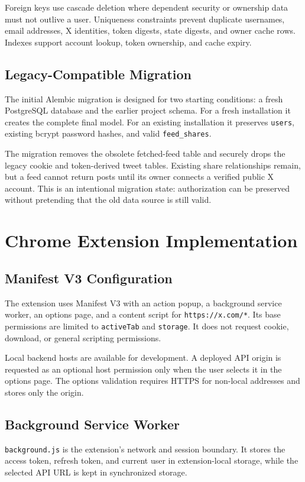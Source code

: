 \documentclass[11pt,a4paper]{report}
\newcommand{\code}[1]{\texttt{#1}}
\begin{document}
Foreign keys use cascade deletion where dependent security or ownership data
must not outlive a user. Uniqueness constraints prevent duplicate usernames,
email addresses, X identities, token digests, state digests, and owner cache
rows. Indexes support account lookup, token ownership, and cache expiry.

\section{Legacy-Compatible Migration}
The initial Alembic migration is designed for two starting conditions: a fresh
PostgreSQL database and the earlier project schema. For a fresh installation it
creates the complete final model. For an existing installation it preserves
\code{users}, existing bcrypt password hashes, and valid
\code{feed\_shares}.

The migration removes the obsolete fetched-feed table and securely drops the
legacy cookie and token-derived tweet tables. Existing share relationships
remain, but a feed cannot return posts until its owner connects a verified
public X account. This is an intentional migration state: authorization can be
preserved without pretending that the old data source is still valid.

\chapter{Chrome Extension Implementation}

\section{Manifest V3 Configuration}
The extension uses Manifest V3 with an action popup, a background service
worker, an options page, and a content script for \code{https://x.com/*}. Its
base permissions are limited to \code{activeTab} and \code{storage}. It does
not request cookie, download, or general scripting permissions.

Local backend hosts are available for development. A deployed API origin is
requested as an optional host permission only when the user selects it in the
options page. The options validation requires HTTPS for non-local addresses
and stores only the origin.

\section{Background Service Worker}
\code{background.js} is the extension's network and session boundary. It stores
the access token, refresh token, and current user in extension-local storage,
while the selected API URL is kept in synchronized storage.
\end{document}
